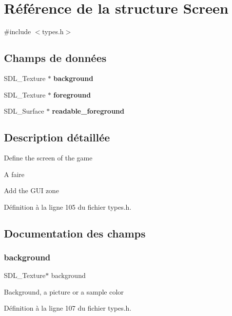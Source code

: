 \section{Référence de la structure Screen}
\label{struct_screen}


{\ttfamily \#include $<$types.\+h$>$}

\subsection*{Champs de données}
\begin{DoxyCompactItemize}
\item 
S\+D\+L\+\_\+\+Texture $\ast$ \textbf{ background}
\item 
S\+D\+L\+\_\+\+Texture $\ast$ \textbf{ foreground}
\item 
S\+D\+L\+\_\+\+Surface $\ast$ \textbf{ readable\+\_\+foreground}
\end{DoxyCompactItemize}


\subsection{Description détaillée}
Define the screen of the game \begin{DoxyRefDesc}{A faire}
\item[\textbf{ A faire}]Add the G\+UI zone \end{DoxyRefDesc}


Définition à la ligne 105 du fichier types.\+h.



\subsection{Documentation des champs}
\mbox{\label{struct_screen_aa6506cd10a348128d0d73bb4dfa58dd5}} 
\subsubsection{background}
{\footnotesize\ttfamily S\+D\+L\+\_\+\+Texture$\ast$ background}

Background, a picture or a sample color 

Définition à la ligne 107 du fichier types.\+h.

\mbox{\label{struct_screen_acc7002f76faedbe16b828b373a96ee5b}} 
